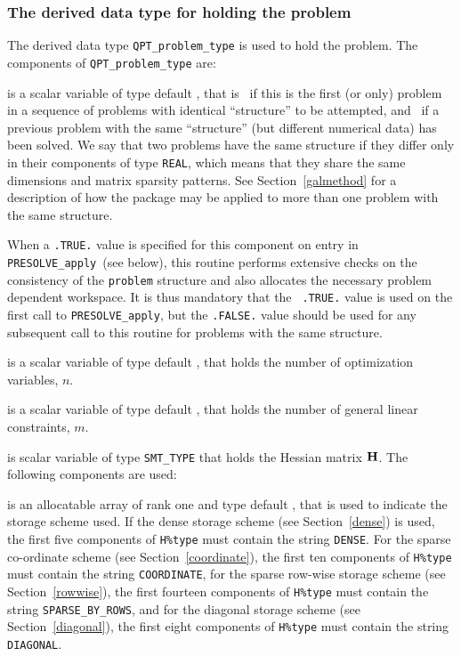 \documentclass{galahad}
\newcommand{\packagename}{PRESOLVE}
\begin{document}

\subsubsection{The derived data type for holding the problem}\label{typeprob}
The derived data type {\tt QPT\_problem\_type} is used to hold
the problem. The components of {\tt QPT\_problem\_type}
are:

\begin{description}

 is a scalar variable of type default \logical,
 that is \true\ if this is the first (or only) problem in a sequence of
 problems with identical ``structure'' to be attempted, and \false\ if
 a previous problem with the same ``structure'' (but different
 numerical data) has been solved. We say that two problems have the same
 structure if they differ only in their components of type {\tt REAL}, which
 means that they share the same dimensions and matrix sparsity patterns.
 See Section~\ref{galmethod} for a description of how the package may be
 applied to  more than one problem with the same structure.

\noindent
 When a {\tt .TRUE.} value is specified for this component on entry in {\tt
 \packagename\_apply}\ (see below), this routine performs extensive checks on
 the consistency of the {\tt problem} structure and also allocates the
 necessary problem dependent workspace.  It is thus mandatory that the {\tt
 .TRUE.} value is used on the first call to {\tt \packagename\_apply}, but
 the {\tt .FALSE.} value should be used for any subsequent call to this
 routine for problems with the same structure.

 is a scalar variable of type default \integer,
 that holds the number of optimization variables, $n$.

 is a scalar variable of type default \integer,
 that holds the number of general linear constraints, $m$.

 is scalar variable of type {\tt SMT\_TYPE}
that holds the Hessian matrix ${\mathbf{H}}$. The following components
are used:

\begin{description}

 is an allocatable array of rank one and type default \character, that
is used to indicate the storage scheme used. If the dense storage scheme
(see Section~\ref{dense}) is used,
the first five components of {\tt H\%type} must contain the
string {\tt DENSE}.
For the sparse co-ordinate scheme (see Section~\ref{coordinate}),
the first ten components of {\tt H\%type} must contain the
string {\tt COORDINATE},
for the sparse row-wise storage scheme (see Section~\ref{rowwise}),
the first fourteen components of {\tt H\%type} must contain the
string {\tt SPARSE\_BY\_ROWS},
and for the diagonal storage scheme (see Section~\ref{diagonal}),
the first eight components of {\tt H\%type} must contain the
string {\tt DIAGONAL}.


\end{description}
\end{description}
\end{document}
